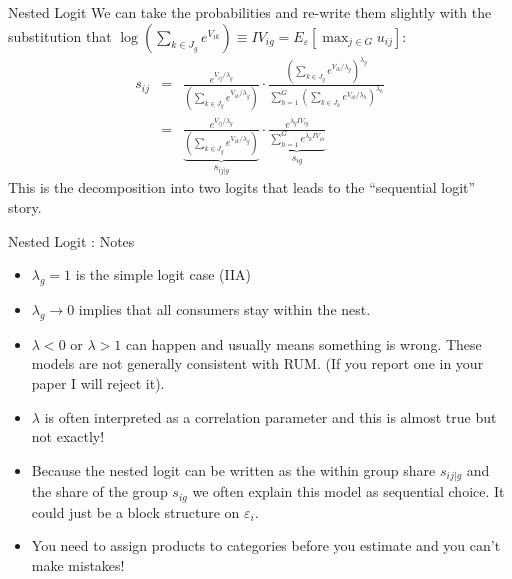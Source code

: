 \documentclass[xcolor=pdftex,dvipsnames,table,mathserif,aspectratio=169]{beamer}
\begin{document}
\begin{frame}{Nested Logit}
We can take the probabilities and re-write them slightly with the substitution that
$\log \left(\sum_{k \in J_g} e^{V_{ik}} \right)\equiv IV_{ig}=E_{\varepsilon}[\max_{j \in G} u_{ij}]$:
\begin{eqnarray*}
s_{ij} &=& \frac{ e^{V_{ij}/\lambda_g}}{ \left(\sum_{k \in J_g} e^{V_{ik}/\lambda_g} \right)}
\cdot
\frac{ \left(\sum_{k \in J_g} e^{V_{ik}/\lambda_g} \right)^{\lambda_g}}{\sum_{h=1}^G \left(\sum_{k \in J_h} e^{V_{ik}/\lambda_h} \right)^{\lambda_h}} \\
&=& \underbrace{\frac{ e^{V_{ij}/\lambda_g}}{ \left(\sum_{k \in J_g} e^{V_{ik}/\lambda_g} \right)}}_{s_{i j | g}}
\cdot
\underbrace{\frac{e^{\lambda_g IV_{ig}}}{\sum_{h=1}^{G} e^{\lambda_h IV_{ih}} }}_{s_{ig}}
\end{eqnarray*}
This is the decomposition into two logits that leads to the ``sequential logit'' story.
\end{frame}



\begin{frame}{Nested Logit : Notes}
\begin{itemize}
\item $\lambda_g=1$ is the simple logit case (IIA)
\item $\lambda_g \rightarrow 0$ implies that all consumers stay within the nest.
\item $\lambda < 0$ or $\lambda > 1$ can happen and usually means something is wrong. These models are not generally consistent with RUM. (If you report one in your paper I will reject it).
\item $\lambda$ is often interpreted as a correlation parameter and this is almost true but not exactly!
\item Because the nested logit can be written as the within group share $s_{ij|g}$ and the share of the group $s_{ig}$ we often explain this model as \alert{sequential choice}. It could just be a \alert{block structure} on $\varepsilon_i$.
\item You need to assign products to categories \alert{before you estimate} and you can't make mistakes!
\end{itemize}
\end{frame}
\end{document}
